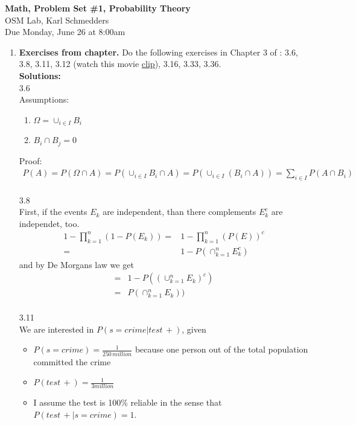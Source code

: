 \documentclass[letterpaper,12pt]{article}
\theoremstyle{definition}
\begin{document}
\begin{flushleft}
   \textbf{\large{Math, Problem Set \#1, Probability Theory}} \\[5pt]
   OSM Lab, Karl Schmedders \\[5pt]
   Due Monday, June 26 at 8:00am
\end{flushleft}

\vspace{5mm}

\begin{enumerate}
	\item {\bf Exercises from chapter.} Do the following exercises in Chapter 3 of \citet{HJ17}: 3.6, 3.8, 3.11, 3.12 (watch this movie \href{https://www.youtube.com/watch?v=Zr_xWfThjJ0}{clip}), 3.16, 3.33, 3.36. \\
	
	\textbf{Solutions:}\\
	3.6\\
 Assumptions: 
\begin{enumerate}
\item  $\Omega = \cup_{i\in I} B_i$ 
\item $B_i\cap B_j = 0$
\end{enumerate}  
Proof: 
\begin{align*}
P(A) =  P(\Omega \cap A) = P(\cup_{i\in I} B_i \cap A)
 = P(\cup_{i \in I} (B_i \cap A)) = \sum_{i \in I} P(A \cap B_i)
\end{align*} \\
3.8 \\ 
First, if the events $E_k$ are independent, than there complements $E_k^c$ are independet, too.
\begin{align*}
1-\prod_{k=1}^{n}(1 - P(E_k)) =& 1 - \prod_{k=1}^{n}\left( P(E) \right)^c \\
=& 1 -P(\cap^n_{k=1} E^c_k) 
\end{align*}
and by De Morgans law we get
\begin{align*}
=& 1 - P((\cup^n_{k=1} E_k)^c) \\
=& P(\cap^n_{k=1} E_k)) 
\end{align*} \\
3.11 \\
We are interested in $P(s=crime|test\, +)$, given
\begin{itemize}
\item $P(s=crime) = \frac{1 }{250 \, million}$ because one person out of the total population committed the crime
\item $P(test\, +) = \frac{1}{3 million}$
\item I assume the test is 100\% reliable in the sense that $P(test\, +|s=crime)=1$.

\end{itemize}
\end{enumerate}
\end{document}
